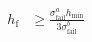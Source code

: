 \begin{align}
	h_\text{f} &\ge  \frac{  \sigma^a_\text{fail}  h_\text{min}  }{  3   \sigma^b_\text{fail} }
\end{align}

